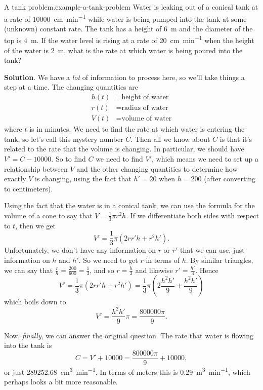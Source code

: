 \documentclass[10pt,]{book}
\numberwithin{equation}{section}
\begin{document}
\begin{example}{A tank problem.}{example-a-tank-problem}%
\hypertarget{p-172}{}%
Water is leaking out of a conical tank at a rate of \SI{10000}{\centi\meter\per\minute} while water is being pumped into the tank at some (unknown) constant rate. The tank has a height of \SI{6}{\meter} and the diameter of the top is \SI{4}{\meter}. If the water level is rising at a rate of \SI{20}{\centi\meter\per\minute} when the height of the water is \SI{2}{\meter}, what is the rate at which water is being poured into the tank?%
\par\smallskip%
\noindent\textbf{Solution}.\hypertarget{solution-38}{}\quad%
\hypertarget{p-173}{}%
We have a \emph{lot} of information to process here, so we'll take things a step at a time. The changing quantities are%
\begin{align*}
h(t) & = \text{height of water} \\
r(t) & = \text{radius of water} \\
V(t) & = \text{volume of water} 
\end{align*}
where \(t\) is in minutes. We need to find the rate at which water is entering the tank, so let's call this mystery number \(C\). Then all we know about \(C\) is that it's related to the rate that the volume is changing. In particular, we should have \(V' = C - 10000\). So to find \(C\) we need to find \(V'\), which means we need to set up a relationship between \(V\) and the other changing quantities to determine how exactly \(V\) is changing, using the fact that \(h' = 20\) when \(h=200\) (after converting to centimeters).%
\par
\hypertarget{p-174}{}%
Using the fact that the water is in a conical tank, we can use the formula for the volume of a cone to say that \(V = \frac{1}{3}\pi r^{2}h\). If we differentiate both sides with respect to \(t\), then we get%
\begin{equation*}
V' = \frac{1}{3}\pi (2rr'h + r^{2}h').
\end{equation*}
Unfortunately, we don't have any information on \(r\) or \(r'\) that we can use, just information on \(h\) and \(h'\). So we need to get \(r\) in terms of \(h\). By similar triangles, we can say that \(\frac{r}{h} = \frac{200}{600} = \frac{1}{3}\), and so \(r = \frac{h}{3}\) and likewise \(r' = \frac{h'}{3}\). Hence%
\begin{equation*}
V' = \frac{1}{3}\pi (2rr'h + r^{2}h') = \frac{1}{3}\pi \left(2\frac{h^{2}h'}{9} + \frac{h^{2}h'}{9}\right)
\end{equation*}
which boils down to%
\begin{equation*}
V' = \frac{h^{2}h'}{9}\pi = \frac{800000\pi}{9}.
\end{equation*}
%
\par
\hypertarget{p-175}{}%
Now, \emph{finally}, we can answer the original question. The rate that water is flowing into the tank is%
\begin{equation*}
C = V' + 10000 = \frac{800000\pi}{9} + 10000,
\end{equation*}
or just \SI{289252.68}{\centi\meter\tothe{3}\per\minute}. In terms of meters this is \SI{.29}{\meter\tothe{3}\per\minute}, which perhaps looks a bit more reasonable.%
\end{example}
\end{document}
